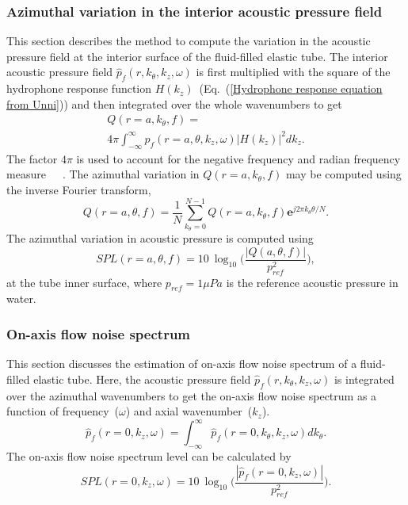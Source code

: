 \documentclass[twocolumn,10pt]{asme2ej}
\begin{document}
\subsubsection{Azimuthal variation in the interior acoustic pressure field}
This section describes the method to compute the variation in the acoustic pressure field at the interior surface of the fluid-filled elastic tube. The interior acoustic pressure field $\hat{p}_f(r,k_\theta,k_z,\omega)$ is first multiplied with the square of the hydrophone response function $H(k_z)$~(Eq.~(\ref{Hydrophone response equation from Unni})) and then integrated over the whole wavenumbers to get
\begin{multline}\label{acoustic pressure field inside}
    Q(r=a,k_\theta,f) =\\  4\pi\int_{-\infty}^{\infty}  \hat{p}_f(r=a,\theta,k_z,\omega)|H(k_z)|^2dk_z.
\end{multline}
The factor $4\pi$ is used to account for the negative frequency and radian frequency measure~\cite{carpenter1983}~\cite{knight1996}~\cite{KUTTANCHANDRIKA2014}. The azimuthal variation in $Q(r=a,k_\theta,f)$ may be computed using the inverse Fourier transform,
\begin{equation}\label{ifft theta inside pressure}
    Q(r=a,\theta,f) = \frac{1}{N}\sum_{k_\theta = 0}^{N-1} Q(r=a,k_\theta,f)\mathbf{e}^{j2\pi k_\theta \theta/N}.
\end{equation}
The azimuthal variation in acoustic pressure is computed using
\begin{equation}\label{SPL for theta variation}
    SPL(r=a,\theta,f) = 10~\log_{10}\bigg(\frac{|Q(a,\theta,f)|}{p_{ref}^2}\bigg),
\end{equation}
at the tube inner surface, where $p_{ref} = 1\mu Pa$ is the reference acoustic pressure in water.

\subsubsection{On-axis flow noise spectrum}
This section discusses the estimation of on-axis flow noise spectrum of a fluid-filled elastic tube. Here, the acoustic pressure field $\hat{p}_f(r,k_\theta,k_z,\omega)$ is integrated over the azimuthal wavenumbers to get the on-axis flow noise spectrum as a function of frequency~($\omega$) and axial wavenumber~($k_z$).
\begin{equation}\label{on-axis flow noise spectrum}
    \hat{p}_f(r=0,k_z,\omega) = \int_{-\infty}^{\infty} \hat{p}_f(r=0,k_\theta,k_z,\omega) dk_\theta.
\end{equation}
The on-axis flow noise spectrum level can be calculated by
\begin{equation}\label{SPL flow noise spectrum}
    SPL(r=0,k_z,\omega) = 10~\log_{10}\bigg(\frac{|\hat{p}_f(r=0,k_z,\omega)|}{p_{ref}^2}\bigg).
\end{equation}
\end{document}
